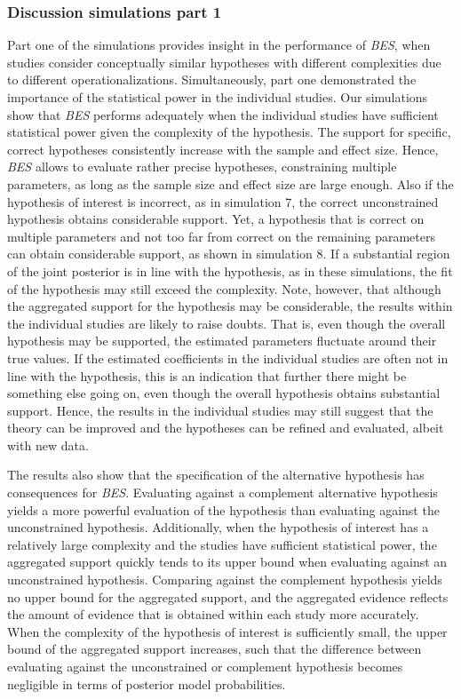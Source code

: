 \documentclass[review, 3p, authoryear]{elsarticle} %
\begin{document}
\hypertarget{discussion-simulations-part-1}{%
\subsubsection{Discussion simulations part 1}\label{discussion-simulations-part-1}}

Part one of the simulations provides insight in the performance of \emph{BES}, when studies consider conceptually similar hypotheses with different complexities due to different operationalizations.
Simultaneously, part one demonstrated the importance of the statistical power in the individual studies.
Our simulations show that \emph{BES} performs adequately when the individual studies have sufficient statistical power given the complexity of the hypothesis.
The support for specific, correct hypotheses consistently increase with the sample and effect size.
Hence, \emph{BES} allows to evaluate rather precise hypotheses, constraining multiple parameters, as long as the sample size and effect size are large enough.
Also if the hypothesis of interest is incorrect, as in simulation 7, the correct unconstrained hypothesis obtains considerable support.
Yet, a hypothesis that is correct on multiple parameters and not too far from correct on the remaining parameters can obtain considerable support, as shown in simulation 8.
If a substantial region of the joint posterior is in line with the hypothesis, as in these simulations, the fit of the hypothesis may still exceed the complexity.
Note, however, that although the aggregated support for the hypothesis may be considerable, the results within the individual studies are likely to raise doubts.
That is, even though the overall hypothesis may be supported, the estimated parameters fluctuate around their true values.
If the estimated coefficients in the individual studies are often not in line with the hypothesis, this is an indication that further there might be something else going on, even though the overall hypothesis obtains substantial support.
Hence, the results in the individual studies may still suggest that the theory can be improved and the hypotheses can be refined and evaluated, albeit with new data.

The results also show that the specification of the alternative hypothesis has consequences for \emph{BES}.
Evaluating against a complement alternative hypothesis yields a more powerful evaluation of the hypothesis than evaluating against the unconstrained hypothesis.
Additionally, when the hypothesis of interest has a relatively large complexity and the studies have sufficient statistical power, the aggregated support quickly tends to its upper bound when evaluating against an unconstrained hypothesis.
Comparing against the complement hypothesis yields no upper bound for the aggregated support, and the aggregated evidence reflects the amount of evidence that is obtained within each study more accurately.
When the complexity of the hypothesis of interest is sufficiently small, the upper bound of the aggregated support increases, such that the difference between evaluating against the unconstrained or complement hypothesis becomes negligible in terms of posterior model probabilities.
\end{document}
